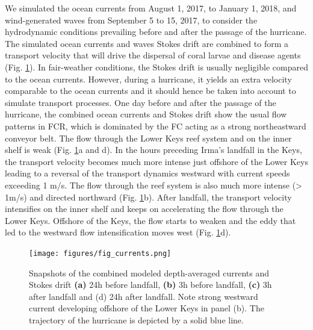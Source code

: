 \documentclass[fleqn,10pt]{wlscirep}
\begin{document}
We simulated the ocean currents from August 1, 2017, to January 1, 2018, and wind-generated waves from September 5 to 15, 2017, to consider the hydrodynamic conditions prevailing before and after the passage of the hurricane. The simulated ocean currents and waves Stokes drift are combined to form a transport velocity that will drive the dispersal of coral larvae and disease agents (Fig. \ref{fig:currents}). In fair-weather conditions, the Stokes drift is usually negligible compared to the ocean currents. However, during a hurricane, it yields an extra velocity comparable to the ocean currents \citep{DobbyIrma} and it should hence be taken into account to simulate transport processes. One day before and after the passage of the hurricane, the combined ocean currents and Stokes drift show the usual flow patterns in FCR, which is dominated by the FC acting as a strong northeastward conveyor belt. The flow through the Lower Keys reef system and on the inner shelf is weak (Fig. \ref{fig:currents}a and d). In the hours preceding Irma's landfall in the Keys, the transport velocity becomes much more intense just offshore of the Lower Keys leading to a reversal of the transport dynamics westward with current speeds exceeding 1 m/s. The flow through the reef system is also much more intense (> 1m/s) and directed northward (Fig. \ref{fig:currents}b). After landfall, the transport velocity intensifies on the inner shelf and keeps on accelerating the flow through the Lower Keys. Offshore of the Keys, the flow starts to weaken and the eddy that led to the westward flow intensification moves west (Fig. \ref{fig:currents}d).

\begin{figure}
    \centering
    \texttt{[image: figures/fig\_currents.png]}
    \caption{Snapshots of the combined modeled depth-averaged currents and Stokes drift \textbf{(a)} 24h before landfall, \textbf{(b)} 3h before landfall, \textbf{(c)} 3h after landfall and (d) 24h after landfall. Note strong westward current developing offshore of the Lower Keys in panel (b). The trajectory of the hurricane is depicted by a solid blue line.}
    \label{fig:currents}
\end{figure}
\end{document}
